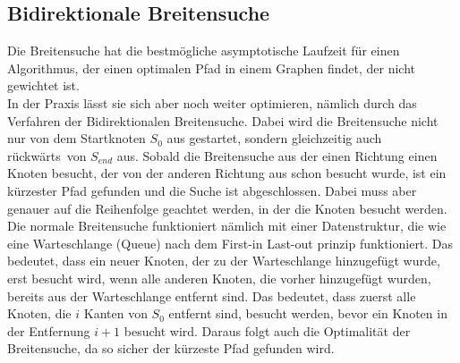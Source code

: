 \documentclass[a4paper,10pt,ngerman]{scrartcl}
\begin{document}
    \subsection{Bidirektionale Breitensuche}
    Die Breitensuche hat die bestmögliche asymptotische Laufzeit für einen Algorithmus, der einen optimalen Pfad in einem Graphen findet, der nicht gewichtet ist. \\
    In der Praxis lässt sie sich aber noch weiter optimieren, nämlich durch das Verfahren der Bidirektionalen Breitensuche.
    Dabei wird die Breitensuche nicht nur von dem Startknoten $S_0$ aus gestartet, sondern gleichzeitig auch \glqq rückwärts\grqq~von $S_{end}$ aus.
    Sobald die Breitensuche aus der einen Richtung einen Knoten besucht, der von der anderen Richtung aus schon besucht wurde, ist ein kürzester Pfad gefunden und die Suche ist abgeschlossen.
    Dabei muss aber genauer auf die Reihenfolge geachtet werden, in der die Knoten besucht werden.
    Die normale Breitensuche funktioniert nämlich mit einer Datenstruktur, die wie eine Warteschlange (Queue) nach dem First-in Last-out prinzip funktioniert. 
    Das bedeutet, dass ein neuer Knoten, der zu der Warteschlange hinzugefügt wurde, erst besucht wird, wenn alle anderen Knoten, die vorher hinzugefügt wurden, bereits aus der Warteschlange entfernt sind.
    Das bedeutet, dass zuerst alle Knoten, die $i$ Kanten von $S_0$ entfernt sind, besucht werden, bevor ein Knoten in der Entfernung $i+1$ besucht wird.
    Daraus folgt auch die Optimalität der Breitensuche, da so sicher der kürzeste Pfad gefunden wird. \\
\end{document}
